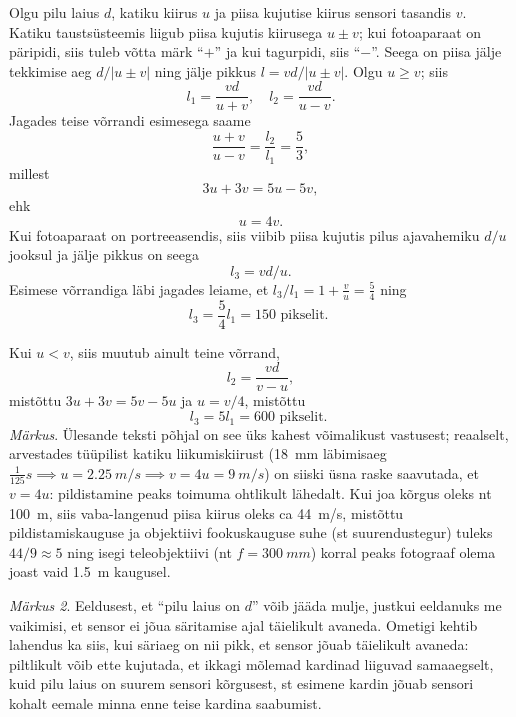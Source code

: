 \documentclass[10pt]{article}
\begin{document}
{%

\solu
Olgu pilu laius $d$, katiku kiirus $u$ ja piisa kujutise kiirus sensori tasandis $v$. Katiku
taustsüsteemis liigub piisa kujutis kiirusega $u \pm v$; kui fotoaparaat on päripidi, siis tuleb võtta märk \enquote{$+$} ja kui tagurpidi, siis \enquote{$-$}. Seega on piisa jälje tekkimise aeg
$d/|u \pm v|$ ning jälje pikkus $l = vd/|u \pm v|$. Olgu $u \geq v$; siis
\[
l_{1}=\frac{v d}{u+v}, \quad l_{2}=\frac{v d}{u-v}.
\]
Jagades teise võrrandi esimesega saame 
\[
\frac{u+v}{u-v}=\frac{l_{2}}{l_{1}}=\frac{5}{3},
\]
millest
\[
3u+ 3v = 5u-5v,
\]
ehk
\[
u = 4v.
\]
Kui fotoaparaat on portreeasendis, siis viibib piisa kujutis pilus ajavahemiku
$d/u$ jooksul ja jälje pikkus on seega
\[
l_3 = vd/u.
\]
Esimese võrrandiga läbi jagades leiame, et $l_3/l_1 = 1 + \frac{v}{u} = \frac{5}{4}$
ning
\[
l_{3}=\frac{5}{4} l_{1}=150 \text { pikselit. }
\]

Kui $u < v$, siis muutub ainult teine võrrand,
\[
l_2 = \frac{vd}{v - u},
\]
mistõttu $3u + 3v = 5v - 5u$ ja $u = v/4$, mistõttu
\[
l_{3}=5 l_{1}=600 \text { pikselit. }
\]
\emph{Märkus}. Ülesande teksti põhjal on see üks kahest võimalikust vastusest; reaalselt, arvestades tüüpilist katiku liikumiskiirust (\SI{18}{mm} läbimisaeg $\frac{1}{125}\si{s} \implies u = \SI{2,25}{m/s} \implies v = 4u = \SI{9}{m/s}$) on siiski üsna raske saavutada, et $v = 4u$: pildistamine peaks toimuma ohtlikult lähedalt. Kui joa kõrgus oleks nt \SI{100}{m}, siis vaba-langenud piisa
kiirus oleks ca \SI{44}{m/s}, mistõttu pildistamiskauguse ja objektiivi fookuskauguse suhe
(st suurendustegur) tuleks $44/9 \approx 5$ ning isegi teleobjektiivi (nt $f = \SI{300}{mm}$) korral
peaks fotograaf olema joast vaid \SI{1,5}{m} kaugusel.

\emph{Märkus 2}. Eeldusest, et \enquote{pilu laius on $d$} võib jääda mulje, justkui eeldanuks me
vaikimisi, et sensor ei jõua säritamise ajal täielikult avaneda. Ometigi kehtib lahendus
ka siis, kui säriaeg on nii pikk, et sensor jõuab täielikult avaneda: piltlikult võib
ette kujutada, et ikkagi mõlemad kardinad liiguvad samaaegselt, kuid pilu laius on
suurem sensori kõrgusest, st esimene kardin jõuab sensori kohalt eemale minna enne
teise kardina saabumist.
\probend
\bigskip


}
\end{document}

